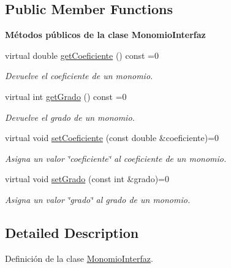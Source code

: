 \subsection*{Public Member Functions}
\begin{Indent}{\bf Métodos públicos de la clase Monomio\-Interfaz}\par
\begin{DoxyCompactItemize}
\item 
virtual double \hyperlink{classed_1_1MonomioInterfaz_a8dade5810b660860408169bca4b35e2e}{get\-Coeficiente} () const =0
\begin{DoxyCompactList}\small\item\em Devuelve el coeficiente de un monomio. \end{DoxyCompactList}\item 
virtual int \hyperlink{classed_1_1MonomioInterfaz_aa5b87185650a82784b39b9bbbaec7dcb}{get\-Grado} () const =0
\begin{DoxyCompactList}\small\item\em Devuelve el grado de un monomio. \end{DoxyCompactList}\item 
virtual void \hyperlink{classed_1_1MonomioInterfaz_a40ba6a0dc0940f60842a319f982aac6d}{set\-Coeficiente} (const double \&coeficiente)=0
\begin{DoxyCompactList}\small\item\em Asigna un valor \char`\"{}coeficiente\char`\"{} al coeficiente de un monomio. \end{DoxyCompactList}\item 
virtual void \hyperlink{classed_1_1MonomioInterfaz_a7294c2a6a1c76ef374202e45f54f1da6}{set\-Grado} (const int \&grado)=0
\begin{DoxyCompactList}\small\item\em Asigna un valor \char`\"{}grado\char`\"{} al grado de un monomio. \end{DoxyCompactList}\end{DoxyCompactItemize}
\end{Indent}


\subsection{Detailed Description}
Definición de la clase \hyperlink{classed_1_1MonomioInterfaz}{Monomio\-Interfaz}. 

